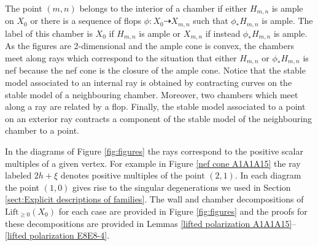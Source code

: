 \documentclass[a4paper]{amsart}
\theoremstyle{definition}
\theoremstyle{plain}
\theoremstyle{remark}
\begin{document}
The point $(m,n)$ belongs to the interior of a chamber if either $H_{m,n}$ is ample on $X_0$ or there is a sequence of flops $\phi:X_0\dashrightarrow X_{m,n}$ such that $\phi_*H_{m,n}$ is ample. The label of this chamber is $X_0$ if $H_{m,n}$ is ample or $X_{m,n}$ if instead $\phi_*H_{m,n}$ is ample. As the figures are 2-dimensional and the ample cone is convex, the chambers meet along rays which correspond to the situation that either $H_{m,n}$ or $\phi_*H_{m,n}$ is nef because the nef cone is the closure of the ample cone. Notice that the stable model associated to an internal ray is obtained by contracting curves on the stable model of a neighbouring chamber. Moreover, two chambers which meet along a ray are related by a flop. Finally, the stable model associated to a point on an exterior ray contracts a component of the stable model of the neighbouring chamber to a point.

In the diagrams of Figure \ref{fig:figures} the rays correspond to the positive scalar multiples of a given vertex. For example in Figure \ref{nef cone A1A1A15} the ray labeled $2h+\xi$ denotes positive multiples of the point $(2,1)$. In each diagram the point $(1,0)$ gives rise to the singular degenerations we used in Section \ref{sect:Explicit descriptions of families}. The wall and chamber decompositions of $\operatorname{Lift_{\geq0}}(X_0)$ for each case are provided in Figure \ref{fig:figures} and the proofs for these decompositions are provided in Lemmas \ref{lifted polarization A1A1A15}--\ref{lifted polarization E8E8-4}.
\end{document}
